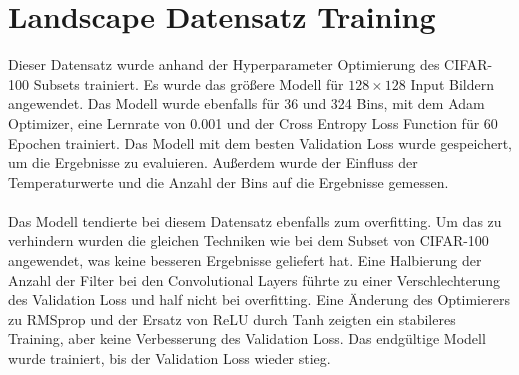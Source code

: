 \section{Landscape Datensatz Training}
Dieser Datensatz wurde anhand der Hyperparameter Optimierung des CIFAR-100 Subsets trainiert. Es wurde das größere Modell für $128 \times 128$
Input Bildern angewendet. Das Modell wurde ebenfalls für 36 und 324 Bins, mit dem Adam Optimizer, eine Lernrate von 0.001 und der Cross Entropy 
Loss Function für 60 Epochen trainiert. Das Modell mit dem besten Validation Loss wurde gespeichert, um die Ergebnisse zu evaluieren. Außerdem
wurde der Einfluss der Temperaturwerte und die Anzahl der Bins auf die Ergebnisse gemessen.
\\
\\
Das Modell tendierte bei diesem Datensatz ebenfalls zum \gls{overfitting}. Um das zu verhindern wurden die gleichen Techniken wie bei dem Subset von CIFAR-100
angewendet, was keine besseren Ergebnisse geliefert hat. Eine Halbierung der Anzahl der Filter bei den Convolutional Layers führte zu einer Verschlechterung
des Validation Loss und half nicht bei \gls{overfitting}. Eine Änderung des Optimierers zu RMSprop und der Ersatz von ReLU durch Tanh zeigten
ein stabileres Training, aber keine Verbesserung des Validation Loss. Das endgültige Modell wurde trainiert, bis der Validation Loss wieder stieg.

